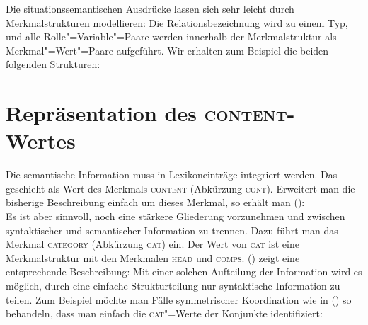 Die situationssemantischen Ausdrücke lassen sich sehr leicht durch Merkmalstrukturen
modellieren: Die Relationsbezeichnung wird zu einem Typ, und alle Rolle"=Variable"=Paare
werden innerhalb der Merkmalstruktur als Merkmal"=Wert"=Paare aufgeführt. Wir erhalten
zum Beispiel die beiden folgenden Strukturen:
\ea
{}
\z

\ea
{}
\z


\section{Repräsentation des \textsc{content}-Wertes}


Die semantische Information muss in Lexikoneinträge integriert
werden. Das geschieht als Wert des Merkmals \textsc{content} (Abkürzung \textsc{cont}).
Erweitert man die bisherige Beschreibung einfach um dieses Merkmal, so erhält man ():
\ea
      \\
\z
Es ist aber sinnvoll, noch eine stärkere Gliederung vorzunehmen und zwischen syntaktischer und semantischer
Information zu trennen. Dazu führt man das Merkmal \textsc{category} (Abkürzung \textsc{cat}) ein. Der Wert
von \textsc{cat} ist eine Merkmalstruktur mit den Merkmalen \textsc{head} und \textsc{comps}. ()
zeigt eine entsprechende Beschreibung:
\ea
\label{geom-cat-cont}
\z
Mit einer solchen Aufteilung der Information wird es möglich, durch eine einfache
Strukturteilung nur syntaktische Information zu teilen. Zum Beispiel möchte
man Fälle symmetrischer\label{page-symmetrische-koordination} Koordination wie in () so behandeln, dass
man einfach die \textsc{cat}"=Werte der Konjunkte identifiziert:
